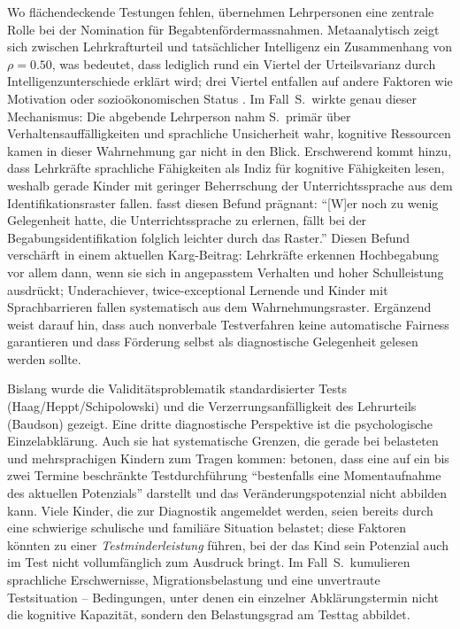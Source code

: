 \documentclass[ngerman, a4paper]{article}
\begin{document}
Wo flächendeckende Testungen fehlen, übernehmen Lehrpersonen eine zentrale
Rolle bei der Nomination für Begabtenfördermassnahmen. Metaanalytisch zeigt
sich zwischen Lehrkrafturteil und tatsächlicher Intelligenz ein Zusammenhang
von $\rho = 0.50$, was bedeutet, dass lediglich rund ein Viertel der
Urteilsvarianz durch Intelligenzunterschiede erklärt wird; drei Viertel
entfallen auf andere Faktoren wie Motivation oder sozioökonomischen Status
\parencite[S.\,118]{baudson2021wasdenken}. Im Fall~S.\ wirkte genau dieser
Mechanismus: Die abgebende Lehrperson nahm S.\ primär über
Verhaltensauffälligkeiten und sprachliche Unsicherheit wahr, kognitive
Ressourcen kamen in dieser Wahrnehmung gar nicht in den Blick. Erschwerend
kommt hinzu, dass Lehrkräfte sprachliche Fähigkeiten als Indiz für kognitive
Fähigkeiten lesen, weshalb gerade Kinder mit geringer Beherrschung der
Unterrichtssprache aus dem Identifikationsraster fallen.
\textcite[S.\,120]{baudson2021wasdenken} fasst diesen Befund prägnant:
\enquote{[W]er noch zu wenig Gelegenheit hatte, die Unterrichtssprache zu
erlernen, fällt bei der Begabungsidentifikation folglich leichter durch das
Raster.}
Diesen Befund verschärft \textcite[S.\,35--40]{baudson2025besserfinden}
in einem aktuellen Karg-Beitrag: Lehrkräfte erkennen Hochbegabung vor allem
dann, wenn sie sich in angepasstem Verhalten und hoher Schulleistung
ausdrückt; Underachiever, twice-exceptional Lernende und Kinder mit
Sprachbarrieren fallen systematisch aus dem Wahrnehmungsraster. Ergänzend
weist \textcite[S.\,68]{koop2025herkunft} darauf hin, dass auch nonverbale
Testverfahren keine automatische Fairness garantieren und dass Förderung
selbst als diagnostische Gelegenheit gelesen werden sollte.

Bislang wurde die Validitätsproblematik standardisierter Tests
(Haag/Heppt/Schipolowski) und die Verzerrungsanfälligkeit des Lehrurteils
(Baudson) gezeigt. Eine dritte diagnostische Perspektive ist die
psychologische Einzelabklärung. Auch sie hat systematische Grenzen, die
gerade bei belasteten und mehrsprachigen Kindern zum Tragen kommen:
\textcite[S.\,239--251]{gauckreimann2021psychdiagnostik} betonen, dass eine
auf ein bis zwei Termine beschränkte Testdurchführung \enquote{bestenfalls
eine Momentaufnahme des aktuellen Potenzials} darstellt und das
Veränderungspotenzial nicht abbilden kann. Viele Kinder, die zur Diagnostik
angemeldet werden, seien bereits durch eine schwierige schulische und
familiäre Situation belastet; diese Faktoren könnten zu einer
\textit{Testminderleistung} führen, bei der das Kind sein Potenzial auch im
Test nicht vollumfänglich zum Ausdruck bringt. Im Fall~S.\ kumulieren
sprachliche Erschwernisse, Migrations\-belastung und eine unvertraute
Testsituation -- Bedingungen, unter denen ein einzelner Abklärungstermin
nicht die kognitive Kapazität, sondern den Belastungsgrad am Testtag
abbildet.
\end{document}
